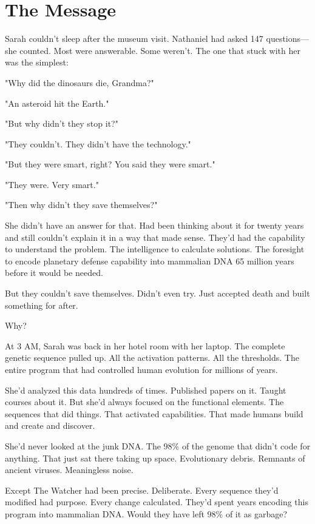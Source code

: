 \chapter{The Message}
\label{ch:31}


Sarah couldn't sleep after the museum visit. Nathaniel had asked 147 questions—she counted. Most were answerable. Some weren't. The one that stuck with her was the simplest:

"Why did the dinosaurs die, Grandma?"

"An asteroid hit the Earth."

"But why didn't they stop it?"

"They couldn't. They didn't have the technology."

"But they were smart, right? You said they were smart."

"They were. Very smart."

"Then why didn't they save themselves?"

She didn't have an answer for that. Had been thinking about it for twenty years and still couldn't explain it in a way that made sense. They'd had the capability to understand the problem. The intelligence to calculate solutions. The foresight to encode planetary defense capability into mammalian DNA 65 million years before it would be needed.

But they couldn't save themselves. Didn't even try. Just accepted death and built something for after.

Why?

At 3 AM, Sarah was back in her hotel room with her laptop. The complete genetic sequence pulled up. All the activation patterns. All the thresholds. The entire program that had controlled human evolution for millions of years.

She'd analyzed this data hundreds of times. Published papers on it. Taught courses about it. But she'd always focused on the functional elements. The sequences that did things. That activated capabilities. That made humans build and create and discover.

She'd never looked at the junk DNA. The 98\% of the genome that didn't code for anything. That just sat there taking up space. Evolutionary debris. Remnants of ancient viruses. Meaningless noise.

Except The Watcher had been precise. Deliberate. Every sequence they'd modified had purpose. Every change calculated. They'd spent years encoding this program into mammalian DNA. Would they have left 98\% of it as garbage?

